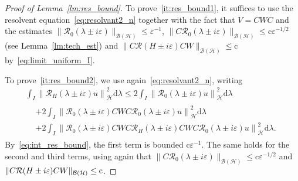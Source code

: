 \documentclass[AHL,Unicode,longabstracts,published]{cedram}
\newcommand{\Hi}{\mathcal{H}}
\newcommand{\rmc}{\mathrm{c}}
\newcommand{\rmd}{\mathrm{d}}
\newcommand{\Res}{\mathcal{R}}
\newcommand{\clB}{\mathcal{B}}
\newcommand{\Hi}{\mathcal{H}}
\begin{document}
\begin{proof}[Proof of Lemma~\ref{lm:res_bound}]
To prove~\eqref{it:res_bound1}, it suffices to use the resolvent equation~\eqref{eq:resolvant2_n} together with the fact that $V=CWC$ and the estimates $\|\Res_0(\lambda\pm i\varepsilon)\|_{\clB(\Hi)}\le\varepsilon^{-1}$, $\|C\Res_0(\lambda\pm i\varepsilon)\|_{\clB(\Hi)}\le\rmc \varepsilon^{-1/2}$ (see Lemma~\ref{lm:tech_est}) and $\|C\Res(H\pm i\varepsilon)CW\|_{\clB(\Hi)}\le\rmc$ by~\eqref{eq:limit_uniform_I}.

To prove~\eqref{it:res_bound2}, we use again~\eqref{eq:resolvant2_n}, writing
\begin{multline*}
\int_I \left\|\Res_H(\lambda\pm i\varepsilon) u\right\|_\Hi^2\rmd \lambda \le2 \int_I \left\|\Res_0(\lambda\pm i\varepsilon) u\right\|_\Hi^2\rmd \lambda \\
\begin{aligned}
&+2\int_I \left\|\Res_0(\lambda\pm i\varepsilon)CWC\Res_0(\lambda\pm i\varepsilon) u\right\|_\Hi^2\rmd \lambda \\
&+2\int_I \left\|\Res_0(\lambda\pm i\varepsilon)CWC\Res_H(\lambda\pm i\varepsilon)CWC\Res_0(\lambda\pm i\varepsilon) u\right\|_\Hi^2\rmd \lambda.
\end{aligned}
\end{multline*}
By~\eqref{eq:int_res_bound}, the first term is bounded $\rmc\varepsilon^{-1}$. The same holds for the second and third terms, using again that $\|C\Res_0(\lambda\pm i\varepsilon)\|_{\clB(\Hi)}\le\rmc \varepsilon^{-1/2}$ and $\|C\Res(H\pm i\varepsilon)CW\|_{\clB(\Hi)}\linebreak\le\rmc$.
\end{proof}



\end{document}
